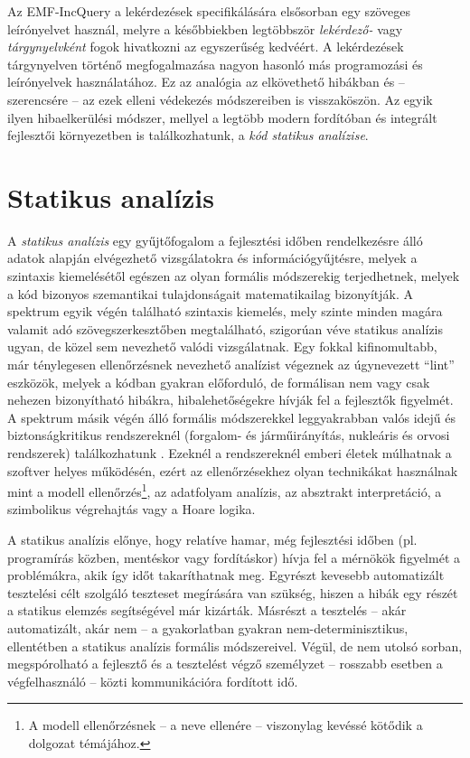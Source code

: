 Az EMF-IncQuery a lekérdezések specifikálására elsősorban egy szöveges leírónyelvet használ, melyre a későbbiekben legtöbbször \emph{lekérdező-} vagy \emph{tárgynyelvként} fogok hivatkozni az egyszerűség kedvéért.
A lekérdezések tárgynyelven történő megfogalmazása nagyon hasonló más programozási és leírónyelvek használatához.
Ez az analógia az elkövethető hibákban és -- szerencsére -- az ezek elleni védekezés módszereiben is visszaköszön.
Az egyik ilyen hibaelkerülési módszer, mellyel a legtöbb modern fordítóban és integrált fejlesztői környezetben is találkozhatunk, a \emph{kód statikus analízise}.

\section{Statikus analízis}

A \emph{statikus analízis} egy gyűjtőfogalom a fejlesztési időben rendelkezésre álló adatok alapján elvégezhető vizsgálatokra és információgyűjtésre, melyek a szintaxis kiemelésétől egészen az olyan formális módszerekig terjedhetnek, melyek a kód bizonyos szemantikai tulajdonságait matematikailag bizonyítják.
A spektrum egyik végén található szintaxis kiemelés, mely szinte minden magára valamit adó szövegszerkesztőben megtalálható, szigorúan véve statikus analízis ugyan, de közel sem nevezhető valódi vizsgálatnak.
Egy fokkal kifinomultabb, már ténylegesen ellenőrzésnek nevezhető analízist végeznek az úgynevezett ``lint'' eszközök, melyek a kódban gyakran előforduló, de formálisan nem vagy csak nehezen bizonyítható hibákra, hibalehetőségekre hívják fel a fejlesztők figyelmét.
A spektrum másik végén álló formális módszerekkel leggyakrabban valós idejű és biztonságkritikus rendszereknél (forgalom- és járműirányítás, nukleáris és orvosi rendszerek) találkozhatunk \cite{Storey:1996:SCC:524721}.
Ezeknél a rendszereknél emberi életek múlhatnak a szoftver helyes működésén, ezért az ellenőrzésekhez olyan technikákat használnak mint a modell ellenőrzés\footnote{A modell ellenőrzésnek -- a neve ellenére -- viszonylag kevéssé kötődik a dolgozat témájához.}, az adatfolyam analízis, az absztrakt interpretáció, a szimbolikus végrehajtás vagy a Hoare logika.

A statikus analízis előnye, hogy relatíve hamar, még fejlesztési időben (pl. programírás közben, mentéskor vagy fordításkor) hívja fel a mérnökök figyelmét a problémákra, akik így időt takaríthatnak meg.
Egyrészt kevesebb automatizált tesztelési célt szolgáló teszteset megírására van szükség, hiszen a hibák egy részét a statikus elemzés segítségével már kizárták.
Másrészt a tesztelés -- akár automatizált, akár nem -- a gyakorlatban gyakran nem-determinisztikus, ellentétben a statikus analízis formális módszereivel.
Végül, de nem utolsó sorban, megspórolható a fejlesztő és a tesztelést végző személyzet -- rosszabb esetben a végfelhasználó -- közti kommunikációra fordított idő.


